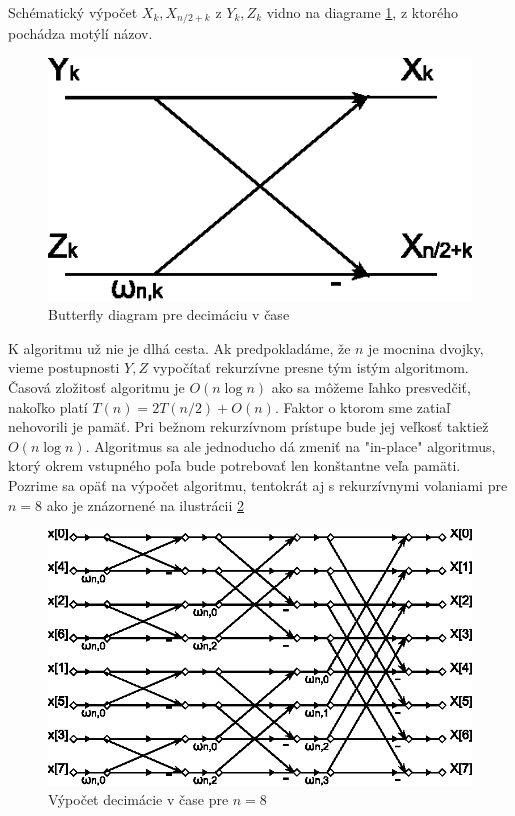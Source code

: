 Schématický výpočet $X_k, X_{n/2+k}$ z $Y_k, Z_k$ vidno na
diagrame \ref{fig:butterfly_dit}, z ktorého pochádza motýlí názov.
\begin{figure}[htp]
    \centering
        \includegraphics{obrazky/algoritmy/butterfly_dit}
        \caption{Butterfly diagram pre decimáciu v čase}
    \label{fig:butterfly_dit}
\end{figure}

K algoritmu už nie je dlhá cesta. Ak predpokladáme, že $n$ je mocnina
dvojky, vieme postupnosti $Y,Z$ vypočítať rekurzívne presne tým istým
algoritmom. Časová zložitosť algoritmu je $O(n\log n)$ ako sa môžeme
ľahko presvedčiť, nakoľko platí $T(n) = 2 T(n/2) + O(n)$.
Faktor o ktorom sme zatiaľ nehovorili je pamäť. Pri bežnom rekurzívnom
prístupe bude jej veľkosť taktiež $O(n \log n)$. Algoritmus sa ale
jednoducho dá zmeniť na "in-place" algoritmus, ktorý okrem vstupného
poľa bude potrebovať len konštantne veľa pamäti. Pozrime sa opäť na
výpočet algoritmu, tentokrát aj s rekurzívnymi volaniami pre $n=8$ ako
je znázornené na ilustrácii \ref{fig:dit}

\begin{figure}[htp]
    \centering
        \includegraphics{obrazky/algoritmy/dit}
        \caption{Výpočet decimácie v čase pre $n=8$}
    \label{fig:dit}
\end{figure}

